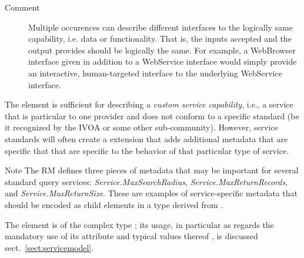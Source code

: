 \documentclass[11pt,a4paper]{ivoa}
\begin{document}
\begin{generated}
\begin{bigdescription}
\begin{description}
\item[Comment] 
                  Multiple occurences can describe different interfaces to 
                  the logically same capability, i.e. data or functionality.
                  That is, the inputs accepted and the output provides should
                  be logically the same.  For example, a WebBrowser interface
                  given in addition to a WebService interface would simply 
                  provide an interactive, human-targeted interface to the 
                  underlying WebService interface.  
               

\end{description}


\end{bigdescription}\endgroup

\endgroup
\end{generated}



The  element is sufficient for describing a
\emph{custom service capability}, i.e., a service that is
particular to one provider and does not conform to a specific standard 
(be it recognized by the IVOA or some other sub-community).  However,
service standards will often create a 
extension that adds additional metadata that are specific that that
are specific to the behavior of that particular type of service.  



\begin{admonition}{Note}
The RM defines three pieces of metadata that may be
important for several standard query services:
\emph{Service.MaxSearchRadius},
\emph{Service.MaxReturnRecords}, and
\emph{Service.MaxReturnSize}.  These are examples of
service-specific metadata that should be encoded as child
elements in a type derived from .  
\end{admonition}


The  element is of the complex type
; its usage, in particular as regards the mandatory
use of its  attribute and typical values thereof , is
discussed sect.~\ref{sect:servicemodel}.
\end{document}
